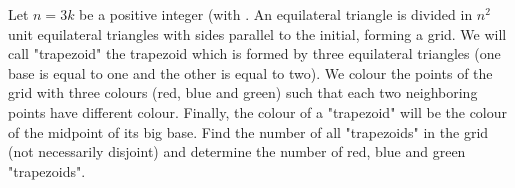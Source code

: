 Let $n=3k$ be a positive integer (with . An equilateral triangle is divided in $n^2$ unit equilateral triangles with sides parallel to the initial, forming a grid. We will call "trapezoid" the trapezoid which is formed by three equilateral triangles (one base is equal to one and the other is equal to two). We colour the points of the grid with three colours (red, blue and green) such that each two neighboring points have different colour.
Finally, the colour of a "trapezoid" will be the colour of the midpoint of its big base.
Find the number of all "trapezoids" in the grid (not necessarily disjoint)  and determine the number of red, blue and green "trapezoids".
